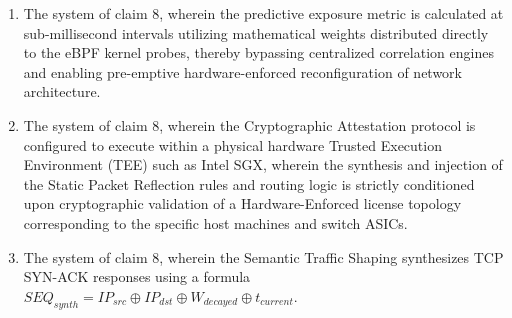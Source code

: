 \documentclass[12pt, letterpaper]{article}
\begin{document}
\begin{enumerate}[label=\textbf{\arabic*.}, leftmargin=*]
    \item The system of claim 8, wherein the predictive exposure metric is calculated at sub-millisecond intervals utilizing mathematical weights distributed directly to the eBPF kernel probes, thereby bypassing centralized correlation engines and enabling pre-emptive hardware-enforced reconfiguration of network architecture.

    \item The system of claim 8, wherein the Cryptographic Attestation protocol is configured to execute within a physical hardware Trusted Execution Environment (TEE) such as Intel SGX, wherein the synthesis and injection of the Static Packet Reflection rules and routing logic is strictly conditioned upon cryptographic validation of a Hardware-Enforced license topology corresponding to the specific host machines and switch ASICs.

    \item The system of claim 8, wherein the Semantic Traffic Shaping synthesizes TCP SYN-ACK responses using a formula $\mathit{SEQ}_{\mathit{synth}} = \mathit{IP}_{\mathit{src}} \oplus \mathit{IP}_{\mathit{dst}} \oplus W_{\mathit{decayed}} \oplus t_{\mathit{current}}$.

\end{enumerate}
\end{document}
